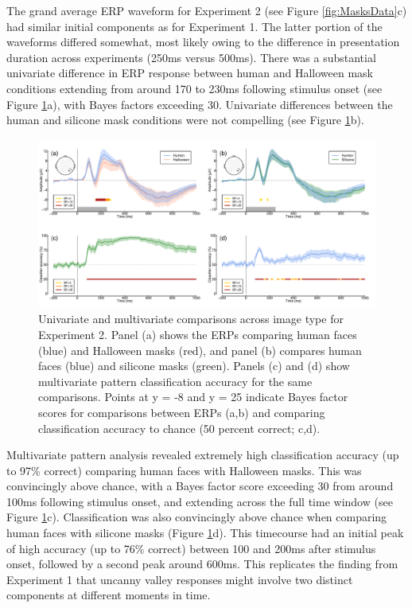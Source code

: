\documentclass[
]{article}
\begin{document}
The grand average ERP waveform for Experiment 2 (see Figure \ref{fig:MasksData}c) had similar initial components as for Experiment 1. The latter portion of the waveforms differed somewhat, most likely owing to the difference in presentation duration across experiments (250ms versus 500ms). There was a substantial univariate difference in ERP response between human and Halloween mask conditions extending from around 170 to 230ms following stimulus onset (see Figure \ref{fig:MasksMVPA}a), with Bayes factors exceeding 30. Univariate differences between the human and silicone mask conditions were not compelling (see Figure \ref{fig:MasksMVPA}b).

\begin{figure}

{\centering \includegraphics{Figures/MasksMVPA} 

}

\caption{Univariate and multivariate comparisons across image type for Experiment 2. Panel (a) shows the ERPs comparing human faces (blue) and Halloween masks (red), and panel (b) compares human faces (blue) and silicone masks (green). Panels (c) and (d) show multivariate pattern classification accuracy for the same comparisons. Points at y = -8 and y = 25 indicate Bayes factor scores for comparisons between ERPs (a,b) and comparing classification accuracy to chance (50 percent correct; c,d).}\label{fig:MasksMVPA}
\end{figure}

Multivariate pattern analysis revealed extremely high classification accuracy (up to 97\% correct) comparing human faces with Halloween masks. This was convincingly above chance, with a Bayes factor score exceeding 30 from around 100ms following stimulus onset, and extending across the full time window (see Figure \ref{fig:MasksMVPA}c). Classification was also convincingly above chance when comparing human faces with silicone masks (Figure \ref{fig:MasksMVPA}d). This timecourse had an initial peak of high accuracy (up to 76\% correct) between 100 and 200ms after stimulus onset, followed by a second peak around 600ms. This replicates the finding from Experiment 1 that uncanny valley responses might involve two distinct components at different moments in time.
\end{document}
